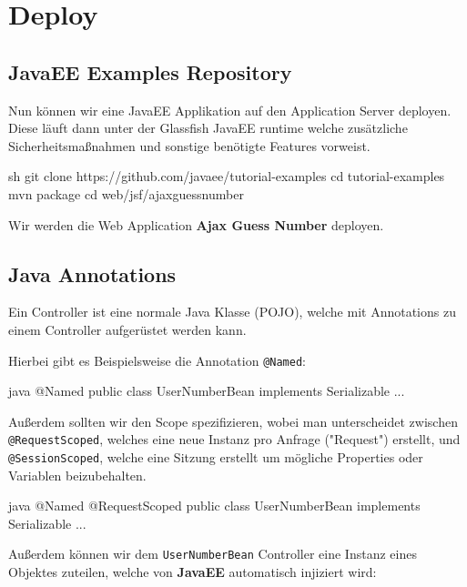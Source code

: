 \clearpage
\section{Deploy}

\subsection{JavaEE Examples Repository}

Nun können wir eine JavaEE Applikation auf den Application Server deployen. Diese läuft dann unter der Glassfish JavaEE runtime welche zusätzliche Sicherheitsmaßnahmen und sonstige benötigte Features vorweist.

\begin{code}{sh}
    git clone https://github.com/javaee/tutorial-examples
    cd tutorial-examples
    mvn package
    cd web/jsf/ajaxguessnumber
\end{code}

Wir werden die Web Application \textbf{Ajax Guess Number} deployen.

\subsection{Java Annotations}

Ein Controller ist eine normale Java Klasse (POJO), welche mit Annotations zu einem Controller aufgerüstet werden kann.

Hierbei gibt es Beispielsweise die Annotation \texttt{@Named}:

\begin{code}{java}
    @Named
    public class UserNumberBean implements Serializable {
        ...
    }
\end{code}

Außerdem sollten wir den Scope spezifizieren, wobei man unterscheidet zwischen \texttt{@RequestScoped}, welches eine neue Instanz pro Anfrage ("Request") erstellt, und \texttt{@SessionScoped}, welche eine Sitzung erstellt um mögliche Properties oder Variablen beizubehalten.

\begin{code}{java}
    @Named
    @RequestScoped
    public class UserNumberBean implements Serializable {
        ...
    }
\end{code}

Außerdem können wir dem \texttt{UserNumberBean} Controller eine Instanz eines Objektes zuteilen, welche von \textbf{JavaEE} automatisch injiziert wird:


